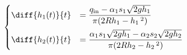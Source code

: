 \begin{equation}
  \begin{cases}
    \displaystyle \diff{h_1(t)}{t} & =
    \displaystyle \frac{
      q_{\mathrm{in}} - \alpha_1 s_1 \sqrt{2gh_1}
    }{
      \pi (2 R h_1 - h_1 \, ^2)
    } %
    \\[10pt]
    \displaystyle \diff{h_2(t)}{t} & = %
    \displaystyle \frac{
      \alpha_1 s_1 \sqrt{2gh_1} - \alpha_2 s_2 \sqrt{2gh_2}
    }{
      \pi (2 R h_2 - h_2 \, ^2)
    }
  \end{cases}
  \label{eq:tank_system}
\end{equation}